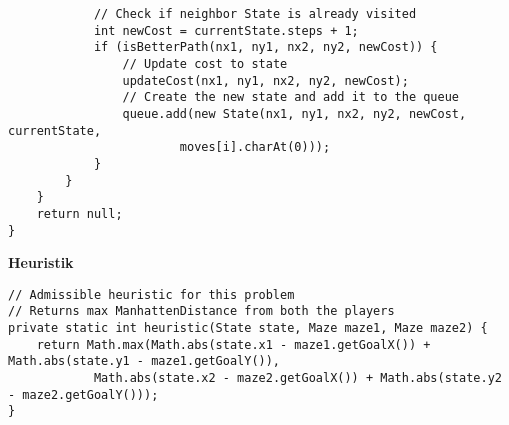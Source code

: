 \documentclass[a4paper,10pt,ngerman]{scrartcl}
\begin{document}
\begin{lstlisting}
            // Check if neighbor State is already visited
            int newCost = currentState.steps + 1;
            if (isBetterPath(nx1, ny1, nx2, ny2, newCost)) {
                // Update cost to state
                updateCost(nx1, ny1, nx2, ny2, newCost);
                // Create the new state and add it to the queue
                queue.add(new State(nx1, ny1, nx2, ny2, newCost, currentState,
                        moves[i].charAt(0)));
            }
        }
    }
    return null;
}
\end{lstlisting}
\textbf{Heuristik}
\begin{lstlisting}
// Admissible heuristic for this problem 
// Returns max ManhattenDistance from both the players
private static int heuristic(State state, Maze maze1, Maze maze2) {
    return Math.max(Math.abs(state.x1 - maze1.getGoalX()) + Math.abs(state.y1 - maze1.getGoalY()),
            Math.abs(state.x2 - maze2.getGoalX()) + Math.abs(state.y2 - maze2.getGoalY()));
}
\end{lstlisting}
\end{document}
